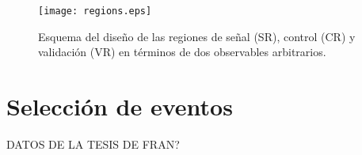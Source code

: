 \begin{figure}
\centering
\texttt{[image: regions.eps]}
\caption{Esquema del diseño de las regiones de señal (SR), control (CR) y validación (VR) en términos de dos observables arbitrarios.}
\label{regions}
\end{figure}

\section{Selección de eventos}

DATOS DE LA TESIS DE FRAN?


